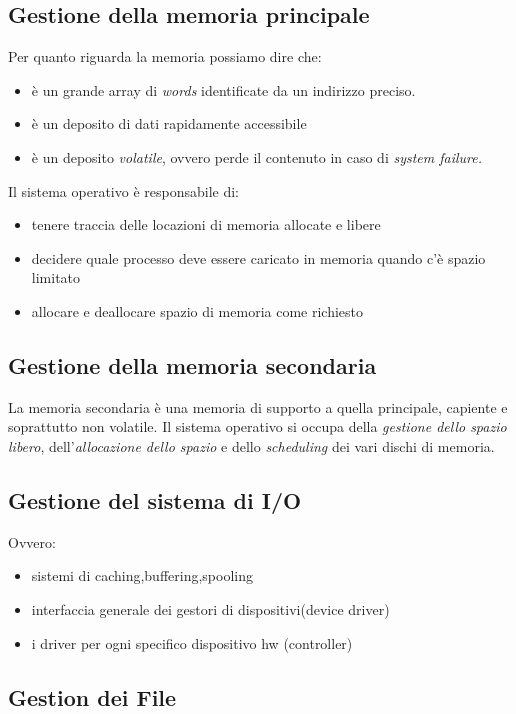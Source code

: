 \documentclass{article}
\begin{document}
\subsection{Gestione della memoria principale}
Per quanto riguarda la memoria possiamo dire che:
\begin{itemize}
    \item è un grande array di \textit{words} identificate da un indirizzo preciso.
    \item è un deposito di dati rapidamente accessibile
    \item è un deposito \textit{volatile}, ovvero perde il contenuto in caso di \it{system failure}. 
\end{itemize}
Il sistema operativo è responsabile di:
\begin{itemize}
    \item tenere traccia delle locazioni di memoria allocate e libere
    \item decidere quale processo deve essere caricato in memoria quando c'è spazio limitato
    \item allocare e deallocare spazio di memoria come richiesto
\end{itemize}

\subsection{Gestione della memoria secondaria}
La memoria secondaria è una memoria di supporto a quella principale, capiente e soprattutto non volatile.
Il sistema operativo si occupa della \textit{gestione dello spazio libero}, dell'\textit{allocazione dello spazio} e dello \textit{scheduling} dei vari dischi di memoria. 

\subsection{Gestione del sistema di I/O}
Ovvero:
\begin{itemize}
    \item sistemi di caching,buffering,spooling
    \item interfaccia generale dei gestori di dispositivi(device driver)
    \item i driver per ogni specifico dispositivo hw (controller)
\end{itemize}

\subsection{Gestion dei File}
\end{document}
